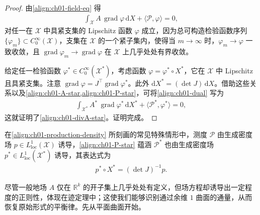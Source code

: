 \documentclass[../../main.tex]{subfiles}
\begin{document}
\begin{proof}
由\cref{align:ch01-field-eq} 得
\begin{align}
\int_{\mathscr{X}}A\,\operatorname{grad}\varphi\,\mathrm{d}X+\langle\mathscr{P},\varphi\rangle=0,\label{align:ch01-dual}
\end{align}
对任一在 $\mathscr{X}$ 中具紧支集的 Lipschitz 函数 $\varphi$ 成立，因为总可构造检验函数序列 $\{\varphi_{m}\}\subset C_{0}^{\infty}(\mathscr{X})$，支集在 $\mathscr{X}$ 的一个紧子集内，使得当 $m\to\infty$ 时，$\varphi_{m}\to\varphi$ 一致收敛，且 $\operatorname{grad}\varphi_{m}\to\operatorname{grad}\varphi$ 在 $\mathscr{X}$ 上几乎处处有界收敛。

给定任一检验函数 $\varphi^{*}\in C_{0}^{\infty}(\mathscr{X}^{*})$，考虑函数 $\varphi=\varphi^{*}\circ X^{*}$，它在 $\mathscr{X}$ 中 Lipschitz 且具紧支集。注意 $\operatorname{grad}\varphi=J^{\top}\operatorname{grad}\varphi^{*}$。此外 $\mathrm{d}X^{*}=(\det J)\,\mathrm{d}X$。借助这些关系以及\cref{align:ch01-A-star,align:ch01-P-star}，可将\cref{align:ch01-dual} 写为
\begin{align}
\int_{\mathscr{X}^{*}}A^{*}\,\operatorname{grad}\varphi^{*}\,\mathrm{d}X^{*}+\langle\mathscr{P}^{*},\varphi^{*}\rangle=0,\label{align:ch01-dual-star}
\end{align}
这就证明了\cref{align:ch01-divA-star}。证明完成。
\end{proof}

\begin{remark}\label{remark:ch01-密度变换}
在\cref{align:ch01-production-density} 所刻画的常见特殊情形中，测度 $\mathscr{P}$ 由生成密度场 $p\in L^{1}_{\mathrm{loc}}(\mathscr{X})$ 诱导，\cref{align:ch01-P-star} 蕴涵 $\mathscr{P}^{*}$ 也由生成密度场 $p^{*}\in L^{1}_{\mathrm{loc}}(\mathscr{X}^{*})$ 诱导，其表达式为
\begin{align}
p^{*}\circ X^{*}=(\det J)^{-1}p.\label{align:ch01-p-star}
\end{align}
\end{remark}

尽管一般地场 $A$ 仅在 $\mathbb{R}^{k}$ 的开子集上几乎处处有定义，但场方程却诱导出一定程度的正则性，体现在迹定理中；这使我们能够识别通过余维 $1$ 曲面的通量，从而恢复原始形式的平衡律。先从平面曲面开始。
\end{document}
